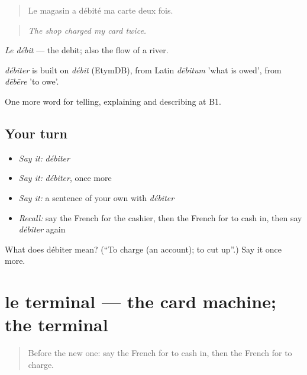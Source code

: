 \begin{quote}
Le magasin a débité ma carte deux fois.
\end{quote}

\begin{quote}
\emph{The shop charged my card twice.}
\end{quote}

\emph{Le débit} — the debit; also the flow of a river.

\begin{cousinweb}
\emph{débiter} is built on \emph{débit} (EtymDB), from Latin \emph{dēbitum} 'what is owed', from \emph{dēbēre} 'to owe'.
\end{cousinweb}

\begin{grammarlens}[title={What you've built}]
One more word for telling, explaining and describing at B1.
\end{grammarlens}

\subsection*{Your turn}
\begin{itemize}
\raggedright
  \item \emph{Say it:} \emph{débiter}
  \item \emph{Say it:} \emph{débiter}, once more
  \item \emph{Say it:} a sentence of your own with \emph{débiter}
  \item \emph{Recall:} say the French for the cashier, then the French for to cash in, then say \emph{débiter} again
\end{itemize}

\begin{tcolorbox}[breakable,colback=teal!4,colframe=teal!35!black,title={Before you move on}]
What does débiter mean? (\textquotedblleft{}To charge (an account); to cut up\textquotedblright{}.) Say it once more.
\end{tcolorbox}
\section[le terminal]{le terminal — the card machine; the terminal}

\label{lesson:FR-C450-terminal}



\begin{quote}
Before the new one: say the French for to cash in, then the French for to charge.
\end{quote}

